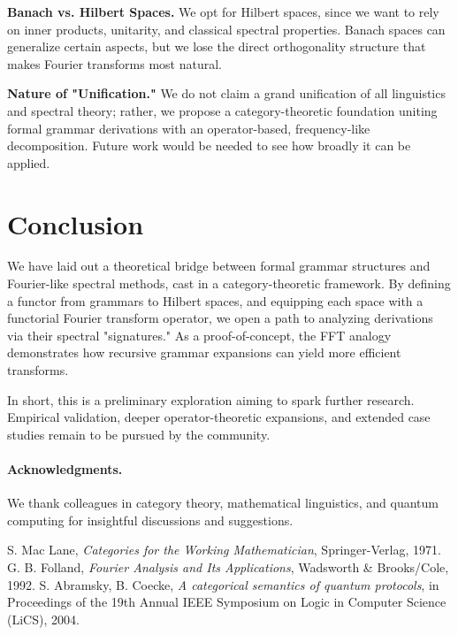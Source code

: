 \documentclass[11pt]{article}
\begin{document}
\noindent\textbf{Banach vs. Hilbert Spaces.} We opt for Hilbert spaces, since we want to rely on inner products, unitarity, and classical spectral properties. Banach spaces can generalize certain aspects, but we lose the direct orthogonality structure that makes Fourier transforms most natural.

\noindent\textbf{Nature of "Unification."} We do not claim a grand unification of all linguistics and spectral theory; rather, we propose a category-theoretic foundation uniting formal grammar derivations with an operator-based, frequency-like decomposition. Future work would be needed to see how broadly it can be applied.

\section{Conclusion}
We have laid out a theoretical bridge between formal grammar structures and Fourier-like spectral methods, cast in a category-theoretic framework. By defining a functor from grammars to Hilbert spaces, and equipping each space with a functorial Fourier transform operator, we open a path to analyzing derivations via their spectral "signatures." As a proof-of-concept, the FFT analogy demonstrates how recursive grammar expansions can yield more efficient transforms. 

In short, this is a preliminary exploration aiming to spark further research. Empirical validation, deeper operator-theoretic expansions, and extended case studies remain to be pursued by the community.

\paragraph{Acknowledgments.} We thank colleagues in category theory, mathematical linguistics, and quantum computing for insightful discussions and suggestions.


\begin{thebibliography}{9}
S. Mac Lane, \textit{Categories for the Working Mathematician}, Springer-Verlag, 1971.
G. B. Folland, \textit{Fourier Analysis and Its Applications}, Wadsworth \& Brooks/Cole, 1992.
S. Abramsky, B. Coecke, \textit{A categorical semantics of quantum protocols}, in Proceedings of the 19th Annual IEEE Symposium on Logic in Computer Science (LiCS), 2004.
\end{thebibliography}
\end{document}
